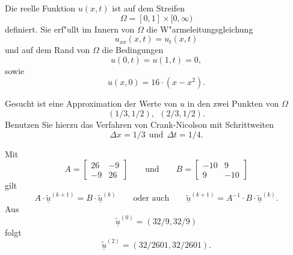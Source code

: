 Die reelle Funktion $u(x,t)$ ist auf dem Streifen
\[
\Omega = [0, 1] \times [0,\infty)
\]
definiert. Sie erf"ullt im Innern von $\Omega$ die W"armeleitungsgleichung
\[
u_{xx}(x,t) = u_{t}(x,t)
\]
und auf dem Rand von $\Omega$ die Bedingungen
\[
u(0,t) = u(1,t) = 0,
\]
sowie
\[
u(x,0) = 16 \cdot (x - x^2).
\]

\vspace{1mm}

Gesucht ist eine Approximation der Werte von $u$ in den zwei Punkten
von $\Omega$
\[
(1/3,1/2), \ \  (2/3,1/2).
\]
Benutzen Sie hierzu das Verfahren von Crank-Nicolson mit Schrittweiten
\[
\Delta x = 1/3 \ \ \mbox{und} \ \  \Delta t = 1/4.
\]

\begin{loesung}
Mit
\[
A = \left[\begin{array}{rr} 26 & -9 \\ -9 & 26 \end{array}\right]
\qquad
\text{und}
\qquad
B = \left[\begin{array}{rr} -10 & 9 \\ 9 & -10 \end{array}\right]
\]
gilt
\[
A \cdot \underline{\tilde u}^{(k+1)} = B \cdot \underline{\tilde u}^{(k)}
\qquad
\text{oder auch}
\qquad
\underline{\tilde u}^{(k+1)} = A^{-1}
\cdot B \cdot \underline{\tilde u}^{(k)}.
\]
Aus 
\[
\underline{\tilde u}^{(0)} = (32/9, 32/9)
\]
folgt
\[
\underline{\tilde u}^{(2)} = (32/2601, 32/2601).
\]
\end{loesung}

